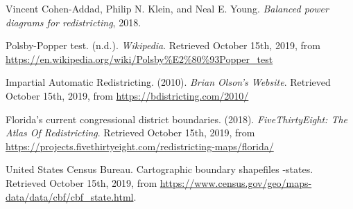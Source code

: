 \documentclass[11pt]{article}
\begin{document}
\begin{thebibliography}{999}

  Vincent Cohen-Addad, Philip N. Klein, and Neal E. Young. \emph{Balanced power diagrams for redistricting}, 2018.

  Polsby-Popper test. (n.d.). \emph{Wikipedia}. Retrieved October 15th, 2019, from \url{https://en.wikipedia.org/wiki/Polsby\%E2\%80\%93Popper_test}

  Impartial Automatic Redistricting. (2010). \emph{Brian Olson's Website}. Retrieved October 15th, 2019, from \url{https://bdistricting.com/2010/}

  Florida’s current congressional district boundaries. (2018). \emph{FiveThirtyEight: The Atlas Of Redistricting}. Retrieved October 15th, 2019, from \url{https://projects.fivethirtyeight.com/redistricting-maps/florida/}

  United States Census Bureau. Cartographic boundary shapefiles -states. Retrieved October 15th, 2019, from \url{https://www.census.gov/geo/maps-data/data/cbf/cbf_state.html}.

\end{thebibliography}

\citation
\end{document}
